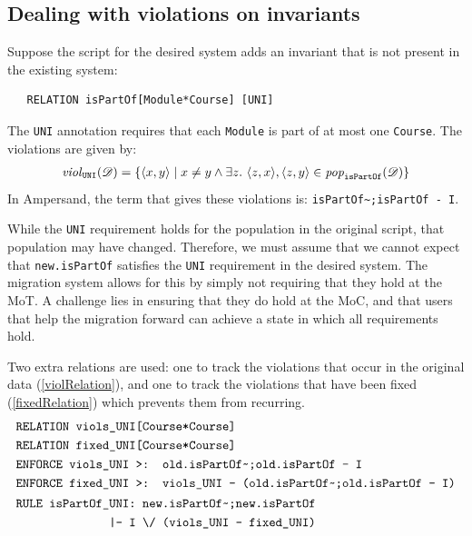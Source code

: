 \documentclass[runningheads]{llncs}
\newcommand{\id}[1]{\text{\it #1\/}}
\newcommand{\pop}[2]{\id{pop}_{#1}(#2)}
\newcommand{\viol}[2]{\violC{#1}(#2)}
\newcommand{\violC}[1]{\id{viol}_{#1}}
\newcommand{\pair}[2]{\langle{#1},{#2}\rangle}
\newcommand{\dataset}{\mathscr{D}}
\begin{document}
   \subsection{Dealing with violations on invariants}
   Suppose the script for the desired system adds an invariant that is not present in the existing system:
   
   \begin{verbatim}
   RELATION isPartOf[Module*Course] [UNI]
   \end{verbatim}
   
   The \verb=UNI= annotation requires that each \verb=Module= is part of at most one \verb=Course=.
   The violations are given by:
   \begin{eqnarray}
   \viol{\tt UNI}{\dataset} = \{\pair{x}{y} \mid x \neq y \wedge \exists z.~ \pair{z}{x}, \pair{z}{y}\in\pop{\tt isPartOf}{\dataset} \}
   \end{eqnarray}
   In Ampersand, the term that gives these violations is: \verb=isPartOf~;isPartOf - I=.
   
   While the \verb=UNI= requirement holds for the population in the original script, that population may have changed.
   Therefore, we must assume that we cannot expect that \verb=new.isPartOf= satisfies the \verb=UNI= requirement in the desired system.
   The migration system allows for this by simply not requiring that they hold at the MoT.
   A challenge lies in ensuring that they do hold at the MoC, and that users that help the migration forward can achieve a state in which all requirements hold.
   
   Two extra relations are used: one to track the violations that occur in the original data (\ref{violRelation}), and one to track the violations that have been fixed (\ref{fixedRelation}) which prevents them from recurring.
   \begin{align}
   &\text{\tt RELATION viols\_UNI[Course*Course]}\label{violRelation}\\
   &\text{\tt RELATION fixed\_UNI[Course*Course]}\label{fixedRelation}\\
   &\text{\tt ENFORCE viols\_UNI >: old.isPartOf\textasciitilde;old.isPartOf - I}\label{fill viols}\\
   &\text{\tt ENFORCE fixed\_UNI >: viols\_UNI - (old.isPartOf\textasciitilde;old.isPartOf - I)}\label{fill fixed}\\
   &\begin{aligned}
   \text{\tt RULE isPartOf\_UNI: new.isPartOf\textasciitilde;new.isPartOf}\\
   \quad\text{\tt |- I \textbackslash/ (viols\_UNI - fixed\_UNI)}
   \end{aligned}\label{rule uni}
   \end{align}
   
\end{document}

